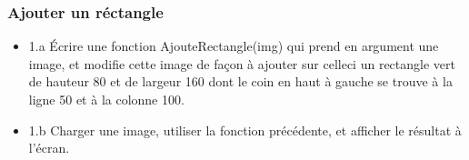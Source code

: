 \documentclass[letterpaper,10pt,english]{jupyterBook}
\begin{document}
\subsubsection{Ajouter un réctangle}
\label{\detokenize{notebooks/images/TRAITEMENT-DES-IMAGES:ajouter-un-rectangle}}\begin{itemize}
\item {} 
\sphinxAtStartPar
1.a Écrire une fonction AjouteRectangle(img) qui prend en argument une image, et modifie cette image de façon à ajouter sur celle\sphinxhyphen{}ci un rectangle vert de hauteur 80 et de largeur 160 dont le coin en haut à gauche se trouve à la ligne 50 et à la colonne 100.

\item {} 
\sphinxAtStartPar
1.b Charger une image, utiliser la fonction précédente, et afficher le résultat à l’écran.

\end{itemize}
\begin{sphinxVerbatimInput}

\begin{sphinxVerbatim}[commandchars=\\\{\}]
   
\end{sphinxVerbatim}
\end{sphinxVerbatimInput}
\begin{sphinxVerbatimInput}

\begin{sphinxVerbatim}[commandchars=\\\{\}]
 
    \PYG{p}{[}\PYG{p}{]}
    \PYG{p}{[}\PYG{p}{]}
    \PYG{p}{[}\PYG{p}{]}
    \PYG{p}{[}\PYG{p}{]}
    \PYG{p}{[}\PYG{p}{]}
     
\end{sphinxVerbatim}
\end{sphinxVerbatimInput}
\end{document}
